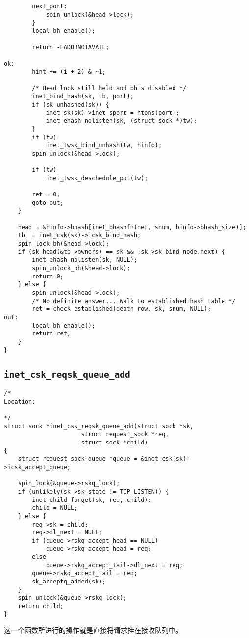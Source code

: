 \begin{verbatim}
        next_port:
            spin_unlock(&head->lock);
        }
        local_bh_enable();

        return -EADDRNOTAVAIL;

ok:
        hint += (i + 2) & ~1;

        /* Head lock still held and bh's disabled */
        inet_bind_hash(sk, tb, port);
        if (sk_unhashed(sk)) {
            inet_sk(sk)->inet_sport = htons(port);
            inet_ehash_nolisten(sk, (struct sock *)tw);
        }
        if (tw)
            inet_twsk_bind_unhash(tw, hinfo);
        spin_unlock(&head->lock);

        if (tw)
            inet_twsk_deschedule_put(tw);

        ret = 0;
        goto out;
    }

    head = &hinfo->bhash[inet_bhashfn(net, snum, hinfo->bhash_size)];
    tb  = inet_csk(sk)->icsk_bind_hash;
    spin_lock_bh(&head->lock);
    if (sk_head(&tb->owners) == sk && !sk->sk_bind_node.next) {
        inet_ehash_nolisten(sk, NULL);
        spin_unlock_bh(&head->lock);
        return 0;
    } else {
        spin_unlock(&head->lock);
        /* No definite answer... Walk to established hash table */
        ret = check_established(death_row, sk, snum, NULL);
out:
        local_bh_enable();
        return ret;
    }
}
\end{verbatim}
    \subsection{\texttt{inet_csk_reqsk_queue_add}}
        \label{INET:inet_csk_reqsk_queue_add}
\begin{verbatim}
/*
Location:

*/
struct sock *inet_csk_reqsk_queue_add(struct sock *sk,
                      struct request_sock *req,
                      struct sock *child)
{
    struct request_sock_queue *queue = &inet_csk(sk)->icsk_accept_queue;

    spin_lock(&queue->rskq_lock);
    if (unlikely(sk->sk_state != TCP_LISTEN)) {
        inet_child_forget(sk, req, child);
        child = NULL;
    } else {
        req->sk = child;
        req->dl_next = NULL;
        if (queue->rskq_accept_head == NULL)
            queue->rskq_accept_head = req;
        else
            queue->rskq_accept_tail->dl_next = req;
        queue->rskq_accept_tail = req;
        sk_acceptq_added(sk);
    }
    spin_unlock(&queue->rskq_lock);
    return child;
}
\end{verbatim}
        这一个函数所进行的操作就是直接将请求挂在接收队列中。

